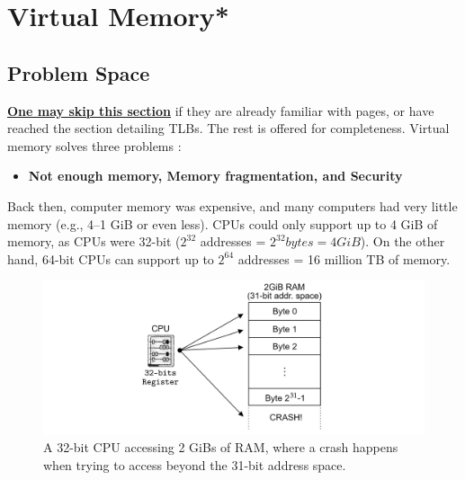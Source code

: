 \newpage
\section{Virtual Memory*}

\label{sec:virt}
\subsection{Problem Space}
\noindent
\underline{\textbf{One may skip this section}} if they are already familiar with pages, or have reached the section detailing TLBs. The 
rest is offered for completeness.
Virtual memory solves three problems \cite{virtualmemory2023}:
\begin{itemize}
    \item \textbf{Not enough memory, Memory fragmentation, and Security}
\end{itemize}
\begin{Def}

    Back then, computer memory was expensive, and many computers had very little memory (e.g., 4--1 GiB or even less).
    CPUs could only support up to 4 GiB of memory, as CPUs were 32-bit ($2^{32}$ addresses = $2^{32} bytes  = 4 GiB$). 
    On the other hand, 64-bit CPUs can support up to $2^{64}$ addresses = 16 million TB of memory.
\end{Def}

\begin{figure}[h]

    \hspace{-7em}
    \includegraphics[width=1.3\textwidth]{Sections/virt/crash.png}
    
    \vspace{1em}
    \caption{A 32-bit CPU accessing 2 GiBs of RAM, where a crash happens when trying to access beyond the 31-bit address space.}
    
    \label{fig:virt1}
\end{figure}
\newpage 


